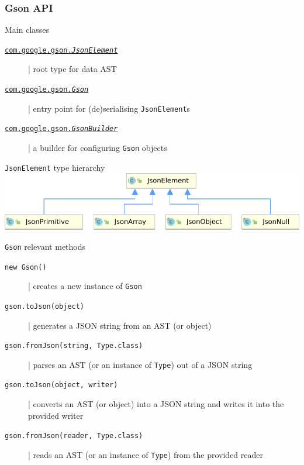 \documentclass{beamer}\mode<presentation>{\usetheme{AMSBolognaFC}}
\begin{document}
\begin{frame}[allowframebreaks]
    \frametitle{Gson API}

    \begin{block}{Main classes}
        \begin{description}
            \item[\href{https://www.javadoc.io/doc/com.google.code.gson/gson/latest/com.google.gson/com/google/gson/JsonElement.html}{\texttt{com.google.gson.\textit{JsonElement}}}] | root type for data AST
            \item[\href{https://www.javadoc.io/doc/com.google.code.gson/gson/latest/com.google.gson/com/google/gson/Gson.html}{\texttt{com.google.gson.\textit{Gson}}}] | entry point for (de)serialising \texttt{JsonElement}s
            \item[\href{https://www.javadoc.io/doc/com.google.code.gson/gson/latest/com.google.gson/com/google/gson/GsonBuilder.html}{\texttt{com.google.gson.\textit{GsonBuilder}}}] | a builder for configuring \texttt{Gson} objects
        \end{description}
    \end{block}

    \begin{exampleblock}{\texttt{JsonElement} type hierarchy}
        \centering
        \includegraphics[width=.5\linewidth]{./img/JsonElementCompact.pdf}
    \end{exampleblock}

    \begin{block}{\texttt{Gson} relevant methods}
        \begin{description}
            \item[\texttt{new Gson()}] | creates a new instance of \texttt{Gson}
            \item[\texttt{gson.toJson(object)}] | generates a JSON string from an AST (or object)
            \item[\texttt{gson.fromJson(string, Type.class)}] | parses an AST (or an instance of \texttt{Type}) out of a JSON string
            \item[\texttt{gson.toJson(object, writer)}] | converts an AST (or object) into a JSON string and writes it into the provided writer
            \item[\texttt{gson.fromJson(reader, Type.class)}] | reads an AST (or an instance of \texttt{Type}) from the provided reader
        \end{description}
    \end{block}


\end{frame}
\end{document}
